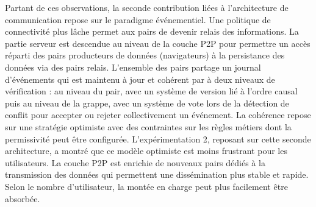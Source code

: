 Partant de ces observations, la seconde contribution liées à l'architecture de 
communication repose sur le paradigme événementiel. Une politique de 
connectivité plus lâche permet aux pairs de devenir relais des informations. La 
partie serveur est \og descendue\fg{} au niveau de la couche \gls{P2P} pour 
permettre un accès réparti des pairs producteurs de données (navigateurs) à la
persistance des données via des pairs relais. L'ensemble des pairs partage un 
journal d'événements qui est maintenu à jour et cohérent par à deux niveaux de 
vérification : au niveau du pair, avec un système de version lié à l'ordre causal 
puis au niveau de la grappe, avec un système de vote lors de la détection de 
conflit pour accepter ou rejeter collectivement un événement. La cohérence repose 
sur une stratégie optimiste avec des contraintes sur les règles métiers dont la 
permissivité peut être configurée.
L'expérimentation 2, reposant sur cette seconde architecture, a montré que ce 
modèle optimiste est moins frustrant pour les utilisateurs. La couche \gls{P2P} est 
enrichie de nouveaux pairs dédiés à la transmission des données qui permettent 
une dissémination plus stable et rapide. Selon le nombre d'utilisateur, la montée 
en charge peut plus facilement être absorbée.




